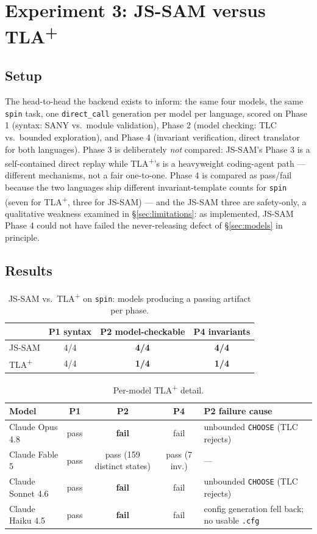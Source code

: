 \documentclass[11pt]{article}
\newcommand{\jssam}{JS-SAM}
\newcommand{\tlaplus}{TLA\texorpdfstring{\textsuperscript{+}}{+}}
\begin{document}
\section{Experiment 3: \jssam{} versus \tlaplus{}}
\label{sec:vstla}

\subsection{Setup}

The head-to-head the backend exists to inform: the same four models, the same
\texttt{spin} task, one \texttt{direct\_call} generation per model per
language, scored on Phase 1 (syntax: SANY vs.\ module validation), Phase 2
(model checking: TLC vs.\ bounded exploration), and Phase 4 (invariant
verification, direct translator for both languages). Phase 3 is deliberately
\emph{not} compared: \jssam{}'s Phase 3 is a self-contained direct replay
while \tlaplus{}'s is a heavyweight coding-agent path --- different
mechanisms, not a fair one-to-one. Phase 4 is compared as pass/fail because
the two languages ship different invariant-template counts for \texttt{spin}
(seven for \tlaplus{}, three for \jssam{}) --- and the \jssam{} three are
safety-only, a qualitative weakness examined in \S\ref{sec:limitations}: as
implemented, \jssam{} Phase 4 could not have failed the never-releasing
defect of \S\ref{sec:models} in principle.

\subsection{Results}

\begin{table}[ht]
\centering
\caption{\jssam{} vs.\ \tlaplus{} on \texttt{spin}: models producing a
passing artifact per phase.}
\label{tab:vstla}
\small
\begin{tabular}{lccc}
\toprule
 & P1 syntax & P2 model-checkable & P4 invariants \\
\midrule
\jssam{}  & 4/4 & \textbf{4/4} & \textbf{4/4} \\
\tlaplus{} & 4/4 & \textbf{1/4} & \textbf{1/4} \\
\bottomrule
\end{tabular}
\end{table}

\begin{table}[ht]
\centering
\caption{Per-model \tlaplus{} detail.}
\label{tab:tladetail}
\small
\begin{tabular}{lcccl}
\toprule
Model & P1 & P2 & P4 & P2 failure cause \\
\midrule
Claude Opus 4.8   & pass & \textbf{fail} & fail & unbounded \texttt{CHOOSE} (TLC rejects) \\
Claude Fable 5    & pass & pass (159 distinct states) & pass (7 inv.) & --- \\
Claude Sonnet 4.6 & pass & \textbf{fail} & fail & unbounded \texttt{CHOOSE} (TLC rejects) \\
Claude Haiku 4.5  & pass & \textbf{fail} & fail & config generation fell back; no usable \texttt{.cfg} \\
\bottomrule
\end{tabular}
\end{table}
\end{document}

